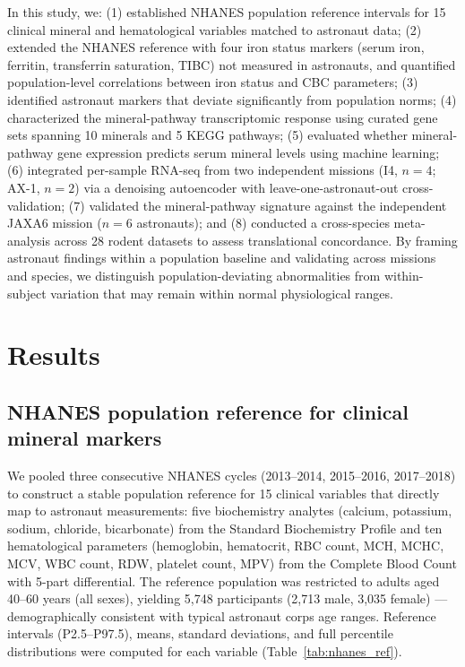 \documentclass[11pt,a4paper]{article}
\begin{document}
In this study, we: (1) established NHANES population reference intervals for 15 clinical mineral and hematological variables matched to astronaut data; (2) extended the NHANES reference with four iron status markers (serum iron, ferritin, transferrin saturation, TIBC) not measured in astronauts, and quantified population-level correlations between iron status and CBC parameters; (3) identified astronaut markers that deviate significantly from population norms; (4) characterized the mineral-pathway transcriptomic response using curated gene sets spanning 10 minerals and 5 KEGG pathways; (5) evaluated whether mineral-pathway gene expression predicts serum mineral levels using machine learning; (6) integrated per-sample RNA-seq from two independent missions (I4, $n = 4$; AX-1, $n = 2$) via a denoising autoencoder with leave-one-astronaut-out cross-validation; (7) validated the mineral-pathway signature against the independent JAXA6 mission ($n = 6$ astronauts); and (8) conducted a cross-species meta-analysis across 28 rodent datasets to assess translational concordance. By framing astronaut findings within a population baseline and validating across missions and species, we distinguish population-deviating abnormalities from within-subject variation that may remain within normal physiological ranges.

\section{Results}

\subsection{NHANES population reference for clinical mineral markers}

We pooled three consecutive NHANES cycles (2013--2014, 2015--2016, 2017--2018) to construct a stable population reference for 15 clinical variables that directly map to astronaut measurements: five biochemistry analytes (calcium, potassium, sodium, chloride, bicarbonate) from the Standard Biochemistry Profile and ten hematological parameters (hemoglobin, hematocrit, RBC count, MCH, MCHC, MCV, WBC count, RDW, platelet count, MPV) from the Complete Blood Count with 5-part differential. The reference population was restricted to adults aged 40--60 years (all sexes), yielding 5,748 participants (2,713 male, 3,035 female) --- demographically consistent with typical astronaut corps age ranges. Reference intervals (P2.5--P97.5), means, standard deviations, and full percentile distributions were computed for each variable (Table~\ref{tab:nhanes_ref}).
\end{document}
